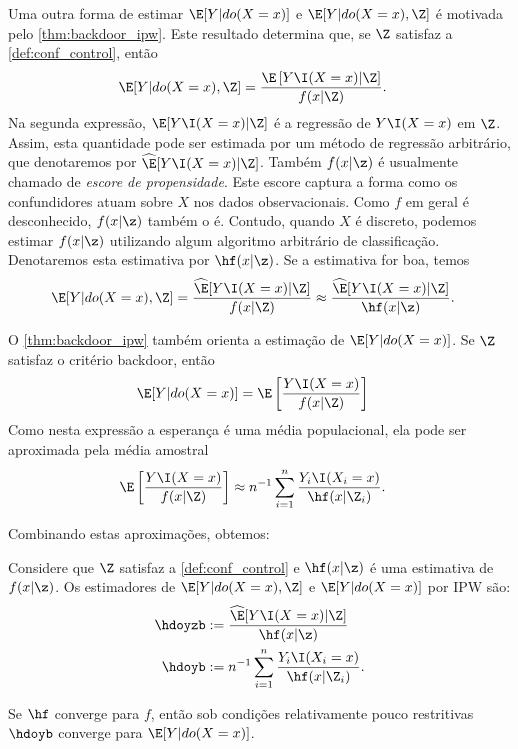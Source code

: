 Uma outra forma de estimar 
$\E[Y|do(X=x)]$ e $\E[Y|do(X=x),\Z]$ é
motivada pelo \cref{thm:backdoor_ipw}.
Este resultado determina que, 
se $\Z$ satisfaz a \cref{def:conf_control}, então
\begin{align*}
 \E[Y|do(X=x),\Z] 
 &= \frac{\E\left[Y \I(X=x)|\Z\right]}{f(x|\Z)}.
\end{align*}
Na segunda expressão, $\E[Y \I(X=x)|\Z]$ é 
a regressão de $Y\I(X=x)$ em $\Z$.
Assim, esta quantidade pode ser estimada por
um método de regressão arbitrário, que
denotaremos por $\widehat{\E}[Y \I(X=x)|\Z]$.
Também $f(x|\z)$ é 
usualmente chamado de \textit{escore de propensidade}.
Este escore captura a forma como 
os confundidores atuam sobre $X$
nos dados observacionais.
Como $f$ em geral é desconhecido,
$f(x|\z)$ também o é.
Contudo, quando $X$ é discreto,
podemos estimar $f(x|\z)$ utilizando
algum algoritmo arbitrário de classificação.
Denotaremos esta estimativa por $\hf(x|\z)$.
Se a estimativa for boa, temos
\begin{align*}
 \E[Y|do(X=x),\Z]
 &= \frac{\widehat{\E}[Y \I(X=x)|\Z]}{f(x|\Z)}
 \approx \frac{\widehat{\E}[Y \I(X=x)|\Z]}{\hf(x|\z)}.
\end{align*}

O \cref{thm:backdoor_ipw} também orienta
a estimação de $\E[Y|do(X=x)]$.
Se $\Z$ satisfaz o critério backdoor, então
\begin{align*}
 \E[Y|do(X=x)]
 &= \E\left[\frac{Y \I(X=x)}{f(x|\Z)}\right]
\end{align*}
Como nesta expressão a esperança é
uma média populacional,
ela pode ser aproximada pela média amostral
\begin{align*}
 \E\left[\frac{Y \I(X=x)}{f(x|\Z)}\right]
 &\approx n^{-1} \sum_{i=1}^n \frac{Y_i \I(X_i=x)}{\hf(x|\Z_i)}.
\end{align*}

Combinando estas aproximações, obtemos:
\begin{definition}
 \label{def:ipw}
 Considere que $\Z$ satisfaz a \cref{def:conf_control} e
 $\hf(x|\z)$ é uma estimativa de $f(x|\z)$.
 Os estimadores de $\E[Y|do(X=x),\Z]$ e $\E[Y|do(X=x)]$ 
 por IPW são:
\begin{align*}
 \hdoyzb &:= \frac{\widehat{\E}[Y \I(X=x)|\Z]}{\hf(x|\z)} \\
 \hdoyb &:= n^{-1} \sum_{i=1}^n \frac{Y_i \I(X_i=x)}{\hf(x|\Z_i)}.
\end{align*}
\end{definition}

Se $\hf$ converge para $f$, então sob 
condições relativamente pouco restritivas
$\hdoyb$ converge para $\E[Y|do(X=x)]$.

